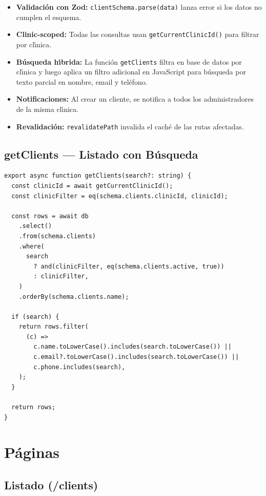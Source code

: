 \begin{itemize}[leftmargin=*]
    \item \textbf{Validaci\'on con Zod:} \texttt{clientSchema.parse(data)}
          lanza error si los datos no cumplen el esquema.
    \item \textbf{Clinic-scoped:} Todas las consultas usan
          \texttt{getCurrentClinicId()} para filtrar por cl\'{\i}nica.
    \item \textbf{B\'usqueda h\'{\i}brida:} La funci\'on \texttt{getClients}
          filtra en base de datos por cl\'{\i}nica y luego aplica un filtro
          adicional en JavaScript para b\'usqueda por texto parcial en
          nombre, email y tel\'efono.
    \item \textbf{Notificaciones:} Al crear un cliente, se notifica a todos
          los administradores de la misma cl\'{\i}nica.
    \item \textbf{Revalidaci\'on:} \texttt{revalidatePath} invalida el
          cach\'e de las rutas afectadas.
\end{itemize}

\subsection{getClients --- Listado con Búsqueda}

\begin{lstlisting}[style=typescript, caption=Funcion getClients]
export async function getClients(search?: string) {
  const clinicId = await getCurrentClinicId();
  const clinicFilter = eq(schema.clients.clinicId, clinicId);

  const rows = await db
    .select()
    .from(schema.clients)
    .where(
      search
        ? and(clinicFilter, eq(schema.clients.active, true))
        : clinicFilter,
    )
    .orderBy(schema.clients.name);

  if (search) {
    return rows.filter(
      (c) =>
        c.name.toLowerCase().includes(search.toLowerCase()) ||
        c.email?.toLowerCase().includes(search.toLowerCase()) ||
        c.phone.includes(search),
    );
  }

  return rows;
}
\end{lstlisting}

\section{P\'aginas}

\subsection{Listado (/clients)}

